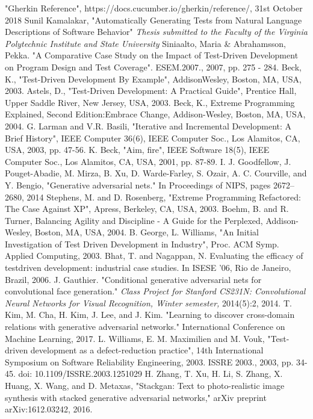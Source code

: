\documentclass[conference]{IEEEtran}
\begin{document}
\begin{thebibliography}{00}
 "Gherkin Reference", https://docs.cucumber.io/gherkin/reference/, 31st October 2018
 Sunil Kamalakar, "Automatically Generating Tests from Natural Language Descriptions of Software Behavior" \textit{Thesis submitted to the Faculty of the
	Virginia Polytechnic Institute and State University
}
Siniaalto, Maria \& Abrahamsson, Pekka. "A Comparative Case Study on the Impact of Test-Driven Development on Program Design and Test Coverage". ESEM.2007., 2007, pp. 275 - 284.
Beck, K., "Test-Driven Development By Example", AddisonWesley,
Boston, MA, USA, 2003.
Astels, D., "Test-Driven Development: A Practical Guide",
Prentice Hall, Upper Saddle River, New Jersey, USA, 2003.
Beck, K., Extreme Programming Explained, Second Edition:Embrace Change, Addison-Wesley, Boston, MA, USA, 2004.
G. Larman and V.R. Basili, "Iterative and Incremental Development: A Brief History", IEEE Computer 36(6), IEEE Computer Soc., Los Alamitos, CA, USA, 2003, pp. 47-56.
 K. Beck, "Aim, fire", IEEE Software 18(5), IEEE Computer
Soc., Los Alamitos, CA, USA, 2001, pp. 87-89.
 I. J. Goodfellow, J. Pouget-Abadie, M. Mirza, B. Xu, D. Warde-Farley, S. Ozair, A. C.
Courville, and Y. Bengio, "Generative adversarial
nets." In Proceedings of NIPS, pages 2672–
2680, 2014
Stephens, M. and D. Rosenberg, "Extreme Programming
Refactored: The Case Against XP", Apress, Berkeley, CA, USA,
2003.
Boehm, B. and R. Turner, Balancing Agility and Discipline
- A Guide for the Perplexed, Addison-Wesley, Boston, MA,
USA, 2004.
B. George, L. Williams, "An Initial Investigation of Test Driven Development in Industry", Proc. ACM Symp. Applied Computing, 2003.
Bhat, T. and Nagappan, N. Evaluating the efficacy of testdriven
development: industrial case studies. In ISESE '06, Rio
de Janeiro, Brazil, 2006.
 J. Gauthier. "Conditional generative adversarial nets for
convolutional face generation." \textit{Class Project for Stanford
CS231N: Convolutional Neural Networks for Visual Recognition,
Winter semester,} 2014(5):2, 2014.
T. Kim, M. Cha, H. Kim, J. Lee, and J. Kim. "Learning to discover cross-domain relations with generative
adversarial networks." International Conference on Machine Learning, 2017.
 L. Williams, E. M. Maximilien and M. Vouk, "Test-driven development as a defect-reduction practice", 14th International Symposium on Software Reliability Engineering, 2003. ISSRE 2003., 2003, pp. 34-45.
doi: 10.1109/ISSRE.2003.1251029
 H. Zhang, T. Xu, H. Li, S. Zhang, X. Huang, X. Wang, and D. Metaxas,
"Stackgan: Text to photo-realistic image synthesis with stacked generative
adversarial networks," arXiv preprint arXiv:1612.03242, 2016.
\end{thebibliography}
\vspace{12pt}
\end{document}
